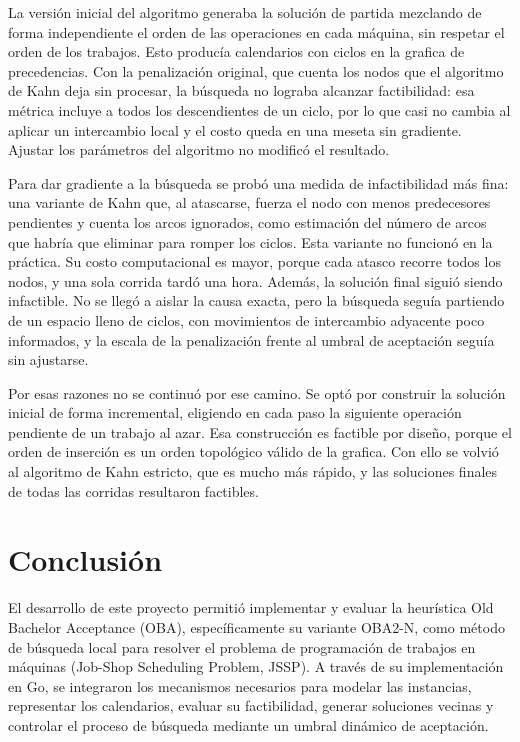 \documentclass[12pt,a4paper]{article}
\begin{document}
La versión inicial del algoritmo generaba la solución de partida mezclando de forma independiente el orden de las operaciones en cada máquina, sin respetar el orden de los trabajos. Esto producía calendarios con ciclos en la grafica de precedencias. Con la penalización original, que cuenta los nodos que el algoritmo de Kahn deja sin procesar, la búsqueda no lograba alcanzar factibilidad: esa métrica incluye a todos los descendientes de un ciclo, por lo que casi no cambia al aplicar un intercambio local y el costo queda en una meseta sin gradiente. Ajustar los parámetros del algoritmo no modificó el resultado.

Para dar gradiente a la búsqueda se probó una medida de infactibilidad más fina: una variante de Kahn que, al atascarse, fuerza el nodo con menos predecesores pendientes y cuenta los arcos ignorados, como estimación del número de arcos que habría que eliminar para romper los ciclos. Esta variante no funcionó en la práctica. Su costo computacional es mayor, porque cada atasco recorre todos los nodos, y una sola corrida tardó una hora. Además, la solución final siguió siendo infactible. No se llegó a aislar la causa exacta, pero la búsqueda seguía partiendo de un espacio lleno de ciclos, con movimientos de intercambio adyacente poco informados, y la escala de la penalización frente al umbral de aceptación seguía sin ajustarse.

Por esas razones no se continuó por ese camino. Se optó por construir la solución inicial de forma incremental, eligiendo en cada paso la siguiente operación pendiente de un trabajo al azar. Esa construcción es factible por diseño, porque el orden de inserción es un orden topológico válido de la  grafica. Con ello se volvió al algoritmo de Kahn estricto, que es mucho más rápido, y las soluciones finales de todas las corridas resultaron factibles.

\section{Conclusión}

El desarrollo de este proyecto permitió implementar y evaluar la heurística Old Bachelor Acceptance (OBA), específicamente su variante OBA2-N, como método de búsqueda local para resolver el problema de programación de trabajos en máquinas (Job-Shop Scheduling Problem, JSSP). A través de su implementación en Go, se integraron los mecanismos necesarios para modelar las instancias, representar los calendarios, evaluar su factibilidad, generar soluciones vecinas y controlar el proceso de búsqueda mediante un umbral dinámico de aceptación.
\end{document}
